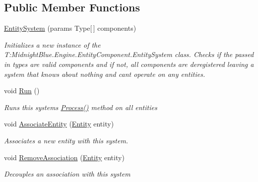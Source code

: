 \subsection*{Public Member Functions}
\begin{DoxyCompactItemize}
\item 
\hyperlink{class_midnight_blue_1_1_engine_1_1_entity_component_1_1_entity_system_a29f645d9fbc5a0490dbff81fb7a1fe34}{Entity\+System} (params Type\mbox{[}$\,$\mbox{]} components)
\begin{DoxyCompactList}\small\item\em Initializes a new instance of the T\+:\+Midnight\+Blue.\+Engine.\+Entity\+Component.\+Entity\+System class. Checks if the passed in types are valid components and if not, all components are deregistered leaving a system that knows about nothing and can\textquotesingle{}t operate on any entities. \end{DoxyCompactList}\item 
void \hyperlink{class_midnight_blue_1_1_engine_1_1_entity_component_1_1_entity_system_af884989f1949c20caac534892784375a}{Run} ()
\begin{DoxyCompactList}\small\item\em Runs this systems \hyperlink{class_midnight_blue_1_1_engine_1_1_entity_component_1_1_entity_system_a94aa715ac6bfe9a720c3d12d56c7598c}{Process()} method on all entities \end{DoxyCompactList}\item 
void \hyperlink{class_midnight_blue_1_1_engine_1_1_entity_component_1_1_entity_system_aac75517905c40ef65fa3733ecb90c6d9}{Associate\+Entity} (\hyperlink{class_midnight_blue_1_1_engine_1_1_entity_component_1_1_entity}{Entity} entity)
\begin{DoxyCompactList}\small\item\em Associates a new entity with this system. \end{DoxyCompactList}\item 
void \hyperlink{class_midnight_blue_1_1_engine_1_1_entity_component_1_1_entity_system_a961d5c483bf74d2ff40cf088d641a6ec}{Remove\+Association} (\hyperlink{class_midnight_blue_1_1_engine_1_1_entity_component_1_1_entity}{Entity} entity)
\begin{DoxyCompactList}\small\item\em Decouples an association with this system \end{DoxyCompactList}\end{DoxyCompactItemize}
